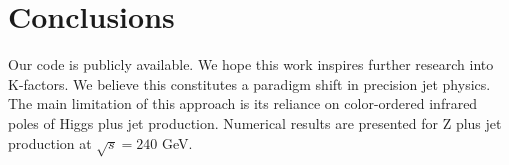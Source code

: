 \section{Conclusions}\label{sec:conclusions}

Our code is publicly available. We hope this work inspires further
research into K-factors. We believe this constitutes a paradigm shift in
precision jet physics. The main limitation of this approach is its
reliance on color-ordered infrared poles of Higgs plus jet production.
Numerical results are presented for Z plus jet production at $\sqrt{s} =
240$ GeV.


